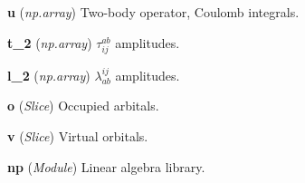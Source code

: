 \begin{tcolorbox}
{\begin{adjustwidth}{4em}{}
            \hspace{1.5em} \textbf{u} (\emph{np.array})
                Two-body operator, Coulomb integrals. 

            \hspace{1.5em} \textbf{t\_2} (\emph{np.array}) $\tau^{ab}_{ij}$ amplitudes.

            \hspace{1.5em} \textbf{l\_2} (\emph{np.array}) $\lambda^{ij}_{ab}$ amplitudes.

            \hspace{1.5em} \textbf{o} (\emph{Slice}) Occupied arbitals.

            \hspace{1.5em} \textbf{v} (\emph{Slice}) Virtual orbitals.

            \hspace{1.5em} \textbf{np} (\emph{Module}) Linear algebra library.

        \end{adjustwidth}

    } 
\end{tcolorbox}